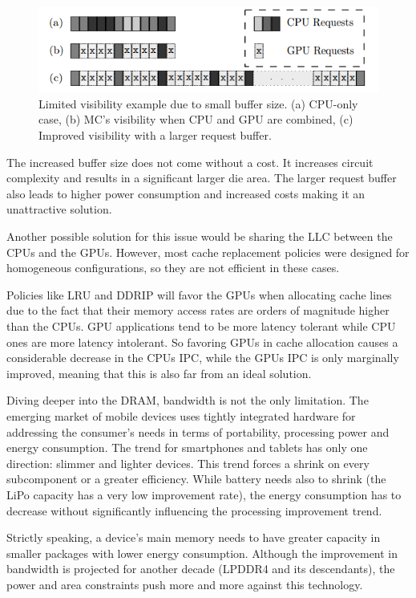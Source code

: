 \documentclass[journal]{IEEEtran}
\begin{document}
\begin{figure}[H]
	\centering
	\includegraphics[width = 8 cm]{graphics/no1.png}
	\caption{Limited visibility example due to small buffer size. (a) CPU-only
		case, (b) MC’s visibility when CPU and GPU are combined, (c) Improved
		visibility with a larger request buffer.\cite{SmS}}\label{fig:buff}
\end{figure} 

The increased buffer size does not come without a cost. It increases circuit complexity and results in a significant larger die area. The larger request buffer also leads to higher power consumption and increased costs \cite{SmS} making it an unattractive solution. 

Another possible solution for this issue would be sharing the LLC between the CPUs and the GPUs. However, most cache replacement policies were designed for homogeneous configurations, so they are not efficient in these cases.

Policies like LRU and DDRIP will favor the GPUs when allocating cache lines due to the fact that their memory access rates are orders of magnitude higher than the CPUs. GPU applications tend to be more latency tolerant while CPU ones are more latency intolerant. So favoring GPUs in cache allocation causes a considerable decrease in the CPUs IPC, while the GPUs IPC is only marginally improved, meaning that this is also far from an ideal solution.

Diving deeper into the DRAM, bandwidth is not the only limitation. The emerging market of mobile devices uses tightly integrated hardware for addressing the consumer's needs in terms of portability, processing power and energy consumption. The trend for smartphones and tablets has only one direction: slimmer and lighter devices. This trend forces a shrink on every subcomponent or a greater efficiency. While battery needs also to shrink (the LiPo capacity has a very low improvement rate), the energy consumption has to decrease without significantly influencing the processing improvement trend. 

Strictly speaking, a device's main memory needs to have greater capacity in smaller packages with lower energy consumption. Although the improvement in bandwidth is projected for another decade (LPDDR4 and its descendants), the power and area constraints push more and more against this technology.
\end{document}
